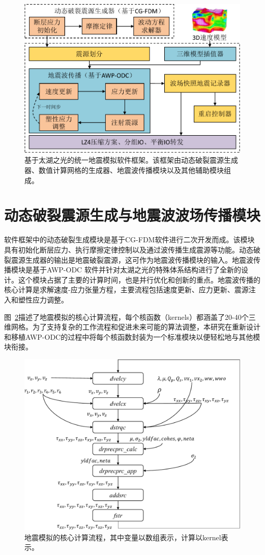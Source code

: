\documentclass[degree=doctor]{thuthesis}
\begin{document}
\begin{figure}[ht]
\centering
\includegraphics[width=0.9\columnwidth]{地震框架-crop.pdf}
\caption{基于太湖之光的统一地震模拟软件框架。该框架由动态破裂震源生成器、数值计算网格的生成器、地震波传播模块以及其他辅助模块组成。}
\label{fig:framework}
\end{figure}

\section{动态破裂震源生成与地震波波场传播模块}

软件框架中的动态破裂生成模块是基于CG-FDM软件\citep{zhang2014three}进行二次开发而成。该模块具有初始化断层应力、执行摩擦定律控制以及通过波传播生成震源等功能。动态破裂震源生成器的输出是地震破裂震源，这可作为地震波传播模块的输入。地震波传播模块是基于AWP-ODC \citep {cui2010scalable}软件并针对太湖之光的特殊体系结构进行了全新的设计。这个模块占据了主要的计算时间，也是并行优化和创新的重点。地震波传播的核心计算是求解速度-应力张量方程，主要流程包括速度更新、应力更新、震源注入和塑性应力调整。

图~\ref{fig:awp-workflow}描述了地震模拟的核心计算流程，每个核函数（kernels）都涵盖了20-40个三维网格。为了支持复杂的工作流程和促进未来可能的算法调整，本研究在重新设计和移植AWP-ODC的过程中将每个核函数封装为一个标准模块以便轻松地与其他模块衔接。

\begin{figure}[ht]
\centering
\includegraphics[width=0.8\columnwidth]{AWP流程图-crop.pdf}
\caption{地震模拟的核心计算流程，其中变量以数组表示，计算以kernel表示。}
\label{fig:awp-workflow}
\end{figure}
\end{document}

